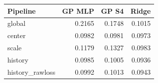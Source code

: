 \begin{tabular}{lrrr}
\toprule
Pipeline & GP MLP & GP S4 & Ridge \\
\midrule
global & 0.2165 & 0.1748 & 0.1015 \\
center & 0.0982 & 0.0981 & 0.0973 \\
scale & 0.1179 & 0.1327 & 0.0983 \\
history & 0.0985 & 0.1005 & 0.0936 \\
history\_rawloss & 0.0992 & 0.1013 & 0.0943 \\
\bottomrule
\end{tabular}
